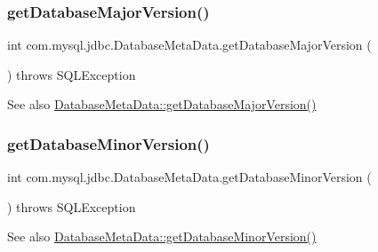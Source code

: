 \subsubsection{\texorpdfstring{get\+Database\+Major\+Version()}{getDatabaseMajorVersion()}}
{\footnotesize\ttfamily int com.\+mysql.\+jdbc.\+Database\+Meta\+Data.\+get\+Database\+Major\+Version (\begin{DoxyParamCaption}{ }\end{DoxyParamCaption}) throws S\+Q\+L\+Exception}

\begin{DoxySeeAlso}{See also}
\mbox{\hyperlink{classcom_1_1mysql_1_1jdbc_1_1_database_meta_data_a07038a3d3e0462c3feaf334d78ad9f33}{Database\+Meta\+Data\+::get\+Database\+Major\+Version()}} 
\end{DoxySeeAlso}
\mbox{\label{classcom_1_1mysql_1_1jdbc_1_1_database_meta_data_a88061ad5314e1e575cb9ff8b5d781411}} 
\subsubsection{\texorpdfstring{get\+Database\+Minor\+Version()}{getDatabaseMinorVersion()}}
{\footnotesize\ttfamily int com.\+mysql.\+jdbc.\+Database\+Meta\+Data.\+get\+Database\+Minor\+Version (\begin{DoxyParamCaption}{ }\end{DoxyParamCaption}) throws S\+Q\+L\+Exception}

\begin{DoxySeeAlso}{See also}
\mbox{\hyperlink{classcom_1_1mysql_1_1jdbc_1_1_database_meta_data_a88061ad5314e1e575cb9ff8b5d781411}{Database\+Meta\+Data\+::get\+Database\+Minor\+Version()}} 
\end{DoxySeeAlso}
\mbox{\label{classcom_1_1mysql_1_1jdbc_1_1_database_meta_data_ae20af1bd814a8658c5ab5c8fab239c0f}} 
